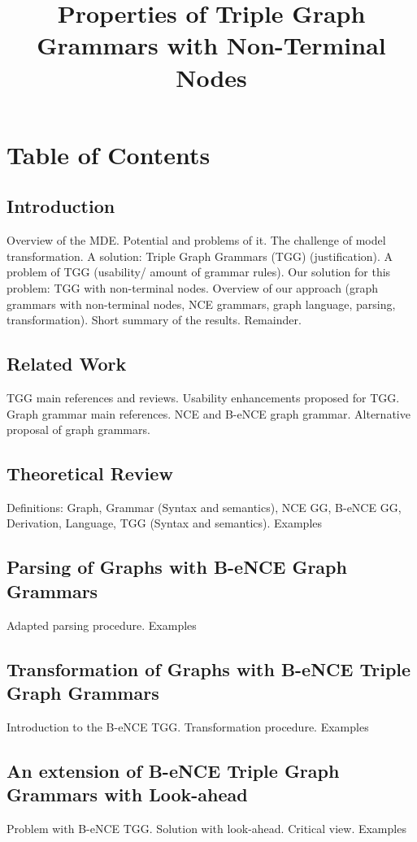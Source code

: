 \documentclass[]{article}
\title{Properties of Triple Graph Grammars with Non-Terminal Nodes}
\author{}
\begin{document}
\maketitle


\section*{Table of Contents}

\subsection*{Introduction}
Overview of the MDE. Potential and problems of it. The challenge of model transformation. A solution: Triple Graph Grammars (TGG) (justification). A problem of TGG (usability/ amount of grammar rules). Our solution for this problem: TGG with non-terminal nodes. Overview of our approach (graph grammars with non-terminal nodes, NCE grammars, graph language, parsing, transformation). Short summary of the results. Remainder.

\subsection*{Related Work}
TGG main references and reviews. Usability enhancements proposed for TGG. Graph grammar main references. NCE and B-eNCE graph grammar. Alternative proposal of graph grammars.

\subsection*{Theoretical Review}
Definitions: Graph, Grammar (Syntax and semantics), NCE GG, B-eNCE GG, Derivation, Language, TGG (Syntax and semantics). Examples

\subsection*{Parsing of Graphs with B-eNCE Graph Grammars}
Adapted parsing procedure. Examples

\subsection*{Transformation of Graphs with B-eNCE Triple Graph Grammars}
Introduction to the B-eNCE TGG. Transformation procedure. Examples

\subsection*{An extension of B-eNCE Triple Graph Grammars with Look-ahead}
Problem with B-eNCE TGG. Solution with look-ahead. Critical view. Examples
\end{document}
